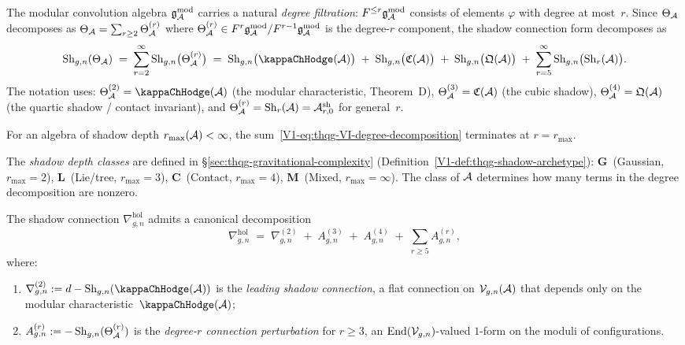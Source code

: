 \begin{remark}
The modular convolution algebra $\mathfrak{g}_{\mathcal{A}}^{\mathrm{mod}}$ carries a natural
\emph{degree filtration}: $F^{\leq r}\mathfrak{g}_{\mathcal{A}}^{\mathrm{mod}}$ consists of elements
$\varphi$ with degree at most~$r$. Since $\Theta_{\mathcal{A}}$ decomposes
as $\Theta_{\mathcal{A}} = \sum_{r \geq 2} \Theta_{\mathcal{A}}^{(r)}$ where
$\Theta_{\mathcal{A}}^{(r)} \in F^r\mathfrak{g}_{\mathcal{A}}^{\mathrm{mod}} / F^{r-1}\mathfrak{g}_{\mathcal{A}}^{\mathrm{mod}}$ is the degree-$r$
component, the shadow connection form decomposes as
\begin{equation}%
\Sh_{g,n}(\Theta_\cA)
\;=\;
\sum_{r=2}^{\infty}
\Sh_{g,n}\bigl(\Theta_\cA^{(r)}\bigr)
\;=\;
\Sh_{g,n}\bigl(\kappaChHodge(\cA)\bigr)
\;+\;
\Sh_{g,n}\bigl(\mathfrak{C}(\cA)\bigr)
\;+\;
\Sh_{g,n}\bigl(\mathfrak{Q}(\cA)\bigr)
\;+\;
\sum_{r=5}^{\infty}\Sh_{g,n}\bigl(\Sh_r(\cA)\bigr).
\end{equation}
The notation uses:
$\Theta_\cA^{(2)} = \kappaChHodge(\cA)$ (the modular characteristic,
Theorem~D),
$\Theta_{\mathcal{A}}^{(3)} = \mathfrak{C}(\mathcal{A})$ (the cubic shadow),
$\Theta_{\mathcal{A}}^{(4)} = \mathfrak{Q}(\mathcal{A})$ (the quartic shadow /
contact invariant), and
$\Theta_{\mathcal{A}}^{(r)} = \operatorname{Sh}_r(\mathcal{A}) = \mathcal{A}^{\mathrm{sh}}_{r,0}$
for general~$r$.

For an algebra of shadow depth $r_{\max}(\mathcal{A}) < \infty$,
the sum~\eqref{V1-eq:thqg-VI-degree-decomposition} terminates at
$r = r_{\max}$.

The \emph{shadow depth classes} are defined in
\S\ref{sec:thqg-gravitational-complexity}
(Definition~\ref{V1-def:thqg-shadow-archetype}):
\textbf{G}~(Gaussian, $r_{\max}=2$),
\textbf{L}~(Lie/tree, $r_{\max}=3$),
\textbf{C}~(Contact, $r_{\max}=4$),
\textbf{M}~(Mixed, $r_{\max}=\infty$).
The class of $\mathcal{A}$ determines how many terms in the
degree decomposition are nonzero.
\end{remark}

\begin{proposition}
The shadow connection $\nabla^{\mathrm{hol}}_{g,n}$ admits a canonical
decomposition
\begin{equation}%
\nabla^{\mathrm{hol}}_{g,n}
\;=\;
\nabla^{(2)}_{g,n}
\;+\;
A^{(3)}_{g,n}
\;+\;
A^{(4)}_{g,n}
\;+\;
\sum_{r \geq 5} A^{(r)}_{g,n},
\end{equation}
where:
\begin{enumerate}[label=\textup{(\roman*)}]
\item $\nabla^{(2)}_{g,n} := d - \Sh_{g,n}(\kappaChHodge(\cA))$ is
 the \emph{leading shadow connection}, a flat connection on
 $\mathcal{V}_{g,n}(\mathcal{A})$ that depends only on the modular
 characteristic~$\kappaChHodge(\cA)$;
\item $A^{(r)}_{g,n} := -\operatorname{Sh}_{g,n}(\Theta_{\mathcal{A}}^{(r)})$ is
 the \emph{degree-$r$ connection perturbation} for $r \geq 3$,
 an $\operatorname{End}(\mathcal{V}_{g,n})$-valued $1$-form on the moduli of
 configurations.
\end{enumerate}
\end{proposition}

